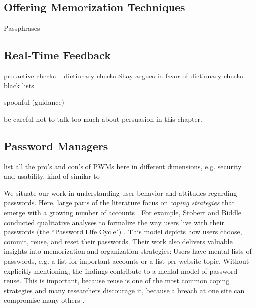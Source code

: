 		
	
	\subsection{Offering Memorization Techniques}
	
	\cite{Bonneau2014ReliableStorage56Bits}
	\cite{Forget2007HelpingUsers}
	
	Passphrases
	\cite{Bonneau2012LinguisticProperties}
	\cite{Shay2012CorrectHorseBatteryStaple}
	
	
	
	\subsection{Real-Time Feedback}
	
	
	pro-active checks -- dictionary checks Shay argues in favor of dictionary checks \cite{Shay2014CanLongPasswordsBeSecureAndUsable} 
	black lists \cite{Habib2017Blacklists} 
	
	spoonful (guidance) \cite{Shay2015SpoonfulOfSugar}
	\cite{Forget2008ImprovingPasswordsThroughPersuasion}
	
	be careful not to talk too much about persuasion in this chapter. 	
	
	\subsection{Password Managers}
	
	list all the pro's and con's of PWMs here in different dimensions, e.g. security and usability, kind of similar to \cite{Bonneau2012ReplacePasswords}
	
	
	
	We situate our work in understanding user behavior and attitudes regarding passwords. Here, large parts of the literature focus on \textit{coping strategies} that emerge with a growing number of accounts \cite{Florencio2007LargeScaleStudyPasswordHabits, Florencio2014PasswordPortfoliosFiniteUser}. For example, Stobert and Biddle conducted qualitative analyses to formalize the way users live with their passwords (the ``Password Life Cycle") \cite{Stobert2014PasswordLifeCycle}. This model depicts how users choose, commit, reuse, and reset their passwords. Their work also delivers valuable insights into memorization and organization strategies: Users have mental lists of passwords, e.g. a list for important accounts or a list per website topic. Without explicitly mentioning, the findings contribute to a mental model of password reuse. This is important, because reuse is one of the most common coping strategies \cite{Das2014TangledWeb, Gaw2006PasswordManagement, Hayashi2011DiaryStudyPWs} and many researchers discourage it, because a breach at one site can compromise many others \cite{Bonneau2012ScienceOfGuessing, Komanduri2011OfPasswordsAndPeople}. 
	
